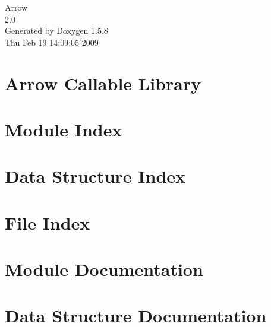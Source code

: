 \documentclass[a4paper]{book}
\begin{document}
\begin{titlepage}
\vspace*{7cm}
\begin{center}
{\Large Arrow \\[1ex]\large 2.0 }\\
\vspace*{1cm}
{\large Generated by Doxygen 1.5.8}\\
\vspace*{0.5cm}
{\small Thu Feb 19 14:09:05 2009}\\
\end{center}
\end{titlepage}
\clearemptydoublepage
{}
\tableofcontents
\clearemptydoublepage
{}
\chapter{Arrow Callable Library}
\label{index}\hypertarget{index}{}
\chapter{Module Index}

\chapter{Data Structure Index}

\chapter{File Index}

\chapter{Module Documentation}


\chapter{Data Structure Documentation}























\end{document}
